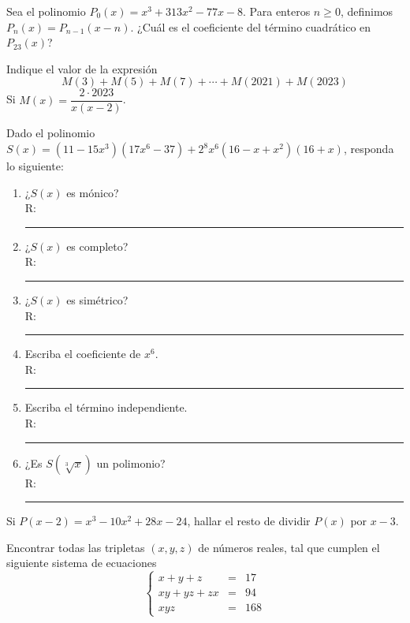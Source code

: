 \begin{section-problem}
    Sea el polinomio $P_0(x) = x^3 + 313x^2 - 77x - 8$.
    Para enteros $n \geq 0$, definimos $P_n(x) = P_{n - 1}(x - n)$.
    ¿Cuál es el coeficiente del término cuadrático en $P_{23}(x)$?
\end{section-problem}

\begin{section-problem}
    Indique el valor de la expresión
    \[M(3)  + M(5) + M(7) + \cdots + M(2021) + M(2023)\]
    Si $M(x) = \dfrac{2\cdot 2023}{x(x - 2)}$.
\end{section-problem}

\begin{section-problem}
    Dado el polinomio $S(x) = (11 - 15x^3)(17x^6 - 37) + 2^8 x^6 (16 - x + x^2)(16 + x)$, responda lo siguiente:
    \begin{multicols}{2}
        \begin{enumerate}
            \item ¿$S(x)$ es mónico? \\R: \rule{1cm}{0.1mm}
            \item ¿$S(x)$ es completo? \\R: \rule{1cm}{0.1mm}
            \item ¿$S(x)$ es simétrico? \\R: \rule{1cm}{0.1mm}
            \item Escriba el coeficiente de $x^6$. \\R: \rule{1cm}{0.1mm}
            \item Escriba el término independiente.\\ R: \rule{1cm}{0.1mm}
            \item ¿Es $S\left(\sqrt[3]{x}\right)$ un polimonio? \\ R: \rule{2cm}{0.1mm}
        \end{enumerate}
    \end{multicols}
\end{section-problem}

\begin{section-problem}
    Si $P(x - 2) = x^3 - 10x^2 + 28x - 24$, hallar el resto de dividir $P(x)$ por $x - 3$.
\end{section-problem}

\begin{section-problem}
    Encontrar todas las tripletas $(x, y, z)$ de números reales, tal que cumplen el siguiente sistema de ecuaciones
    \[
        \left\{
        \begin{array}{rcl}
            x + y + z & =& 17\\
            xy + yz + zx & =& 94\\
            x y z & =& 168
        \end{array}
        \right.
    \]
\end{section-problem}

